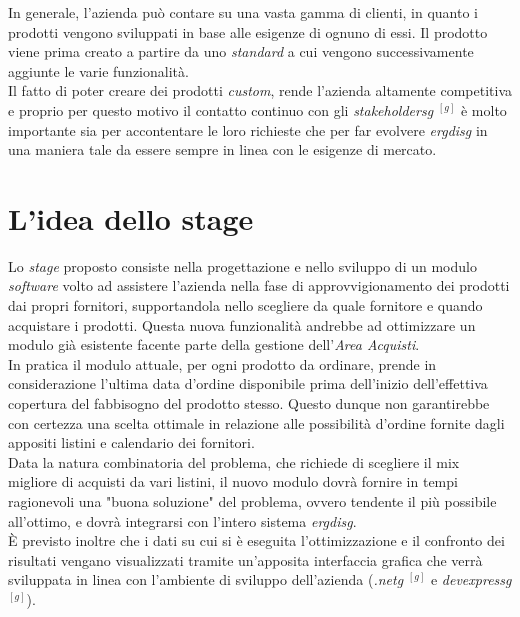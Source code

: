 \noindent In generale, l'azienda può contare su una vasta gamma di clienti,
in quanto i prodotti vengono sviluppati in base alle esigenze di ognuno di essi.
Il prodotto viene prima creato a partire da uno \textit{standard}
a cui vengono successivamente aggiunte le varie funzionalità.\\
Il fatto di poter creare dei prodotti \textit{custom}, rende l'azienda altamente competitiva
e proprio per questo motivo il contatto
continuo con gli \textit{\gls{stakeholdersg}} $^{[g]}$ è molto importante sia per accontentare le loro richieste che per
far evolvere \textit{\gls{ergdisg}} in una maniera tale da essere sempre in linea con le esigenze di mercato.


\section{L'idea dello stage}
\noindent Lo \textit{stage} proposto consiste nella progettazione e nello sviluppo di un modulo \textit{software} volto
ad assistere l'azienda nella fase di approvvigionamento dei prodotti dai propri fornitori, supportandola nello scegliere
da quale fornitore e quando acquistare i prodotti.
\noindent Questa nuova funzionalità andrebbe ad ottimizzare un modulo già esistente facente parte della
gestione dell'\textit{Area Acquisti}.\\
In pratica il modulo attuale, per ogni prodotto da ordinare, prende in considerazione l'ultima data d'ordine disponibile prima dell'inizio
dell'effettiva copertura del fabbisogno del prodotto stesso. Questo dunque non garantirebbe con certezza una scelta ottimale
in relazione alle possibilità d'ordine fornite dagli appositi listini e calendario dei fornitori.\\

\noindent Data la natura combinatoria del problema, che richiede di scegliere il mix migliore di acquisti da vari listini, il nuovo modulo dovrà fornire in tempi ragionevoli una "buona soluzione"
del problema, ovvero tendente il più possibile all'ottimo, e dovrà integrarsi con l'intero sistema \textit{\gls{ergdisg}}.\\

\noindent È previsto inoltre che i dati su cui si è eseguita l'ottimizzazione e il confronto dei risultati vengano visualizzati tramite un'apposita
interfaccia grafica che verrà sviluppata in linea con l'ambiente di sviluppo dell'azienda (\textit{\gls{.netg}} $^{[g]}$ e \textit{\gls{devexpressg}} $^{[g]}$).


